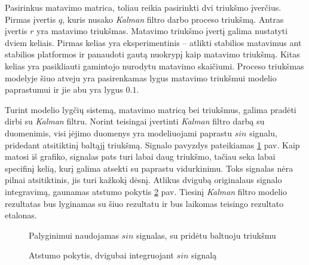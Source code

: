 Pasirinkus matavimo matrica, toliau reikia pasirinkti dvi triukšmo įverčius.
Pirmas įvertis $q$, kuris nusako \textit{Kalman} filtro darbo proceso triukšmą.
Antras įvertis $r$ yra matavimo triukšmas. 
Matavimo triukšmo įvertį galima nustatyti dviem keliais. 
Pirmas kelias yra eksperimentinis -- atlikti stabilios matavimus ant stabilios platformos ir panaudoti gautą nuokrypį kaip matavimo triukšmą.
Kitas kelias yra pasikliauti gamintojo nurodytu matavimo skaičiumi.
Proceso triukšmas modelyje šiuo atveju yra pasirenkamas lygus matavimo triukšmui modelio paprastumui ir jie abu yra lygus $0.1$.

Turint modelio lygčių sistemą, matavimo matricą bei triukšmus, galima pradėti dirbi su \textit{Kalman} filtru.
Norint teisingai įvertinti \textit{Kalman} filtro darbą su duomenimis, visi įėjimo duomenys yra modeliuojami paprastu $sin$ signalu, pridedant atsitiktinį baltąjį triukšmą.
Signalo pavyzdys pateikiamas \ref{fig:sin_acc_data_with_noise} pav.
Kaip matosi iš grafiko, signalas pats turi labai daug triukšmo, tačiau seka labai specifinį kelią, kurį galima atsekti su paprastu vidurkinimu.
Toks signalas nėra pilnai atsitiktinis, jis turi kažkokį dėsnį.
Atlikus dvigubą originalaus signalo integravimą, gaunamas atstumo pokytis \ref{fig:sin_distance_data_with_noise} pav.
Tiesinį \textit{Kalman} filtro modelio rezultatas bus lyginamas su šiuo rezultatu ir bus laikomas teisingo rezultato etalonas.

\begin{figure}
    \centering
    \caption{Palyginimui naudojamas $sin$ signalas, su pridėtu baltuoju triukšmu}
    \label{fig:sin_acc_data_with_noise}
\end{figure}

\begin{figure}
    \centering
    \caption{Atstumo pokytis, dvigubai integruojant $sin$ signalą}
    \label{fig:sin_distance_data_with_noise}
\end{figure}

